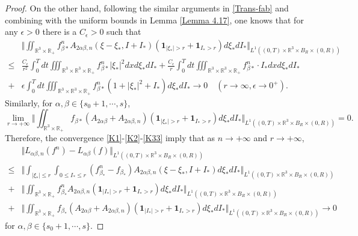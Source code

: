 \documentclass[reqno,11pt]{amsart}
\numberwithin{equation}{section}
\def\R{\mathbb{R}}
\begin{document}
\begin{proof}
On the other hand, following the similar arguments in \eqref{Trans-fab} and combining with the uniform bounds in Lemma \ref{Lemma 4.17}, one knows that for any $\epsilon > 0$ there is a $C_\epsilon > 0$ such that
\begin{equation}\label{K2}
	\begin{aligned}
		&\Vert \iint_{ \R^3 \times \R_+} f^n_{ \beta *} A_{2\alpha \beta ,n}(\xi -\xi_* ,I+I_* ) ( \mathbf{1}_{|\xi_*|>r}+ \mathbf{1}_{I_*>r})d\xi_* dI_* \Vert_{L^1((0,T)\times \R^3 \times B_R \times (0,R))} \\
		\leq & \tfrac{C_\epsilon}{r^2} \int_0^T dt \iiint_{ \R^3 \times \R^3 \times \R_+} f^n_{\beta *} |\xi_*|^2 dxd\xi_* dI_*  + \tfrac{C_\epsilon}{r} \int_0^T dt \iiint_{ \R^3 \times \R^3 \times \R_+} f^n_{\beta *} \cdot I_* dxd\xi_* dI_* \\
		+ & \epsilon  \int_0^T dt \iiint_{ \R^3 \times \R^3 \times \R_+} f^n_{\beta *} (1+|\xi_*|^2+I_*) d\xi_* dI_* \rightarrow 0 \quad (r \rightarrow \infty, \epsilon \rightarrow 0^+).
	\end{aligned}
\end{equation}
Similarly, for $\alpha, \beta \in \{ s_0 + 1, \cdots, s \}$,
\begin{equation}\label{K33}
	\lim_{r \to + \infty} \Vert \iint_{ \R^3 \times \R_+} f_{ \beta *} (A_{2\alpha \beta }+ A_{2\alpha \beta,n }) ( \mathbf{1}_{|\xi_*|>r}+ \mathbf{1}_{I_*>r})d\xi_* dI_* \Vert_{L^1((0,T)\times \R^3 \times B_R \times (0,R))} = 0.
\end{equation}
Therefore, the convergence \eqref{K1}-\eqref{K2}-\eqref{K33} imply that as $n \to + \infty$ and $r \to + \infty$,
\begin{equation}\label{K4}
	\begin{aligned}
		&\Vert L_{ \alpha \beta ,n} (f^n ) -L_{ \alpha \beta} (f) \Vert_{L^1((0,T)\times \R^3 \times B_R \times (0,R))}\\
		\leq &\Vert \int_{|\xi_* |\leq r} \int_{0\leq I_* \leq r} (f^n_{ \beta_*}-f_{\beta_*}) A_{2\alpha \beta ,n}(\xi -\xi_* ,I+I_* ) d\xi_* dI_*  \Vert_{L^1((0,T)\times \R^3 \times B_R \times (0,R))} \\
		+&\Vert \iint_{ \R^3 \times \R_+} f^n_{ \beta_*} A_{2\alpha \beta ,n} ( \mathbf{1}_{|I_*|>r}+ \mathbf{1}_{I_*>r})d\xi_* dI_* \Vert_{L^1((0,T)\times \R^3 \times B_R \times (0,R))} \\
		+& \Vert \iint_{ \R^3 \times \R_+} f_{ \beta_*} (A_{2\alpha \beta }+ A_{2\alpha \beta,n }) ( \mathbf{1}_{|I_*|>r}+ \mathbf{1}_{I_*>r})d\xi_* dI_* \Vert_{L^1((0,T)\times \R^3 \times B_R \times (0,R))} \rightarrow 0 
	\end{aligned}
\end{equation}
for $\alpha, \beta \in \{ s_0 + 1, \cdots, s \}$.


\end{proof}
\end{document}

